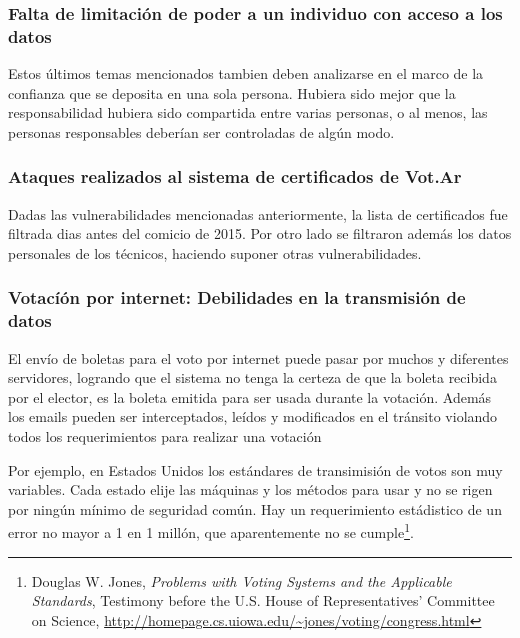 \subsubsection{Falta de limitación de poder a un individuo con acceso a los datos}

Estos últimos temas mencionados tambien deben analizarse en el marco de la confianza que se deposita en una sola persona. Hubiera sido mejor que la responsabilidad hubiera sido compartida entre varias personas, o al menos, las personas responsables deberían ser controladas de algún modo.

\subsubsection{Ataques realizados al sistema de certificados de Vot.Ar}
Dadas las vulnerabilidades mencionadas anteriormente, la lista de certificados fue filtrada dias antes del comicio de 2015. Por otro lado se filtraron además los datos personales de los técnicos, haciendo suponer otras vulnerabilidades.

\subsubsection{Votacíón por internet: Debilidades en la transmisión de datos}
El envío de boletas para el voto por internet puede pasar por muchos y diferentes servidores, logrando que el sistema no tenga la certeza de que la boleta recibida por el elector, es la boleta emitida para ser usada durante la votación. Además los emails pueden ser interceptados, leídos y modificados en el tránsito violando todos los requerimientos para realizar una votación

Por ejemplo, en Estados Unidos los estándares de transimisión de votos son muy variables. Cada estado elije las máquinas y los métodos para usar y no se rigen por ningún mínimo de seguridad común. Hay un requerimiento estádistico de un error no mayor a 1 en 1 millón, que aparentemente no se cumple\footnote{Douglas W. Jones, \textit{Problems with Voting Systems and the Applicable Standards}, Testimony before the U.S. House of Representatives' Committee on Science, \url{http://homepage.cs.uiowa.edu/~jones/voting/congress.html}}.
